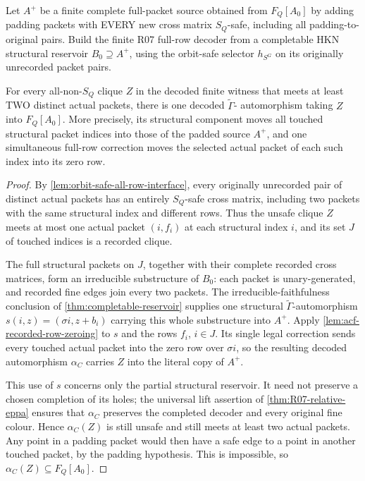 \begin{lemma}
\label{lem:acf-multipacket-rooted-transport}
Let \(A^+\) be a finite complete full-packet
source obtained from \(F_Q[A_0]\) by adding
padding packets with EVERY new cross matrix
\(S_Q\)-safe, including all padding-to-original
pairs. Build the finite R07 full-row decoder
from a completable HKN structural reservoir
\(B_0\supseteq A^+\), using the orbit-safe
selector \(h_{S^G}\) on its originally
unrecorded packet pairs.

For every all-non-\(S_Q\) clique \(Z\)
in the decoded finite witness that
meets at least TWO distinct actual packets,
there is one decoded \(\widetilde\Gamma\)-
automorphism taking \(Z\) into
\(F_Q[A_0]\). More precisely, its
structural component moves all touched
structural packet indices into those of
the padded source \(A^+\), and one
simultaneous full-row correction moves
the selected actual packet of each such
index into its zero row.
\end{lemma}
\begin{proof}
By \cref{lem:orbit-safe-all-row-interface}, every originally
unrecorded pair of distinct actual packets has an entirely
\(S_Q\)-safe cross matrix, including two packets with the same
structural index and different rows. Thus the unsafe clique
\(Z\) meets at most one actual packet \((i,f_i)\) at each
structural index \(i\), and its set \(J\) of touched indices
is a recorded clique.

The full structural packets on \(J\), together with their
complete recorded cross matrices, form an irreducible
substructure of \(B_0\): each packet is unary-generated,
and recorded fine edges join every two packets.
The irreducible-faithfulness conclusion of
\cref{thm:completable-reservoir} supplies one structural
\(\widetilde\Gamma\)-automorphism
\(s(i,z)=(\sigma i,z+b_i)\) carrying this whole substructure
into \(A^+\). Apply \cref{lem:acf-recorded-row-zeroing} to
\(s\) and the rows \(f_i\), \(i\in J\). Its single legal
correction sends every touched actual packet into the zero row
over \(\sigma i\), so the resulting decoded automorphism
\(\alpha_C\) carries \(Z\) into the literal copy of \(A^+\).

This use of \(s\) concerns only the partial structural reservoir.
It need not preserve a chosen completion of its holes; the
universal lift assertion of \cref{thm:R07-relative-eppa}
ensures that \(\alpha_C\) preserves the completed decoder and
every original fine colour. Hence \(\alpha_C(Z)\) is still
unsafe and still meets at least two actual packets. Any point
in a padding packet would then have a safe edge to a point in
another touched packet, by the padding hypothesis. This is
impossible, so \(\alpha_C(Z)\subseteq F_Q[A_0]\).
\end{proof}

